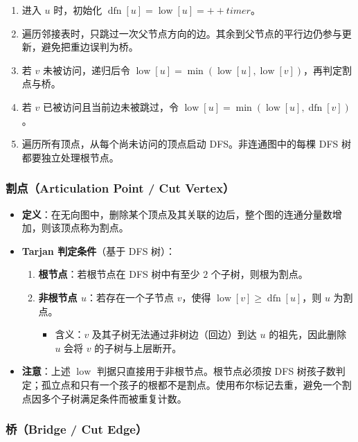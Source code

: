 \begin{enumerate}
  \item 进入 $u$ 时，初始化 $\operatorname{dfn}[u] = \operatorname{low}[u] = ++\mathit{timer}$。
  \item 遍历邻接表时，只跳过一次父节点方向的边。其余到父节点的平行边仍参与更新，避免把重边误判为桥。
  \item 若 $v$ 未被访问，递归后令 $\operatorname{low}[u] = \min(\operatorname{low}[u], \operatorname{low}[v])$，再判定割点与桥。
  \item 若 $v$ 已被访问且当前边未被跳过，令 $\operatorname{low}[u] = \min(\operatorname{low}[u], \operatorname{dfn}[v])$。
  \item 遍历所有顶点，从每个尚未访问的顶点启动 DFS。非连通图中的每棵 DFS 树都要独立处理根节点。
\end{enumerate}

\subsubsection{割点（Articulation Point / Cut Vertex）}

\begin{itemize}
  \item \textbf{定义}：在无向图中，删除某个顶点及其关联的边后，整个图的连通分量数增加，则该顶点称为割点。
  \item \textbf{Tarjan 判定条件}（基于 DFS 树）：
    \begin{enumerate}
      \item \textbf{根节点}：若根节点在 DFS 树中有至少 $2$ 个子树，则根为割点。
      \item \textbf{非根节点 $u$}：若存在一个子节点 $v$，使得 $\operatorname{low}[v] \ge \operatorname{dfn}[u]$，则 $u$ 为割点。
        \begin{itemize}
          \item 含义：$v$ 及其子树无法通过非树边（回边）到达 $u$ 的祖先，因此删除 $u$ 会将 $v$ 的子树与上层断开。
        \end{itemize}
    \end{enumerate}
  \item \textbf{注意}：上述 $\operatorname{low}$ 判据只直接用于非根节点。根节点必须按 DFS 树孩子数判定；孤立点和只有一个孩子的根都不是割点。使用布尔标记去重，避免一个割点因多个子树满足条件而被重复计数。
\end{itemize}

\subsubsection{桥（Bridge / Cut Edge）}


